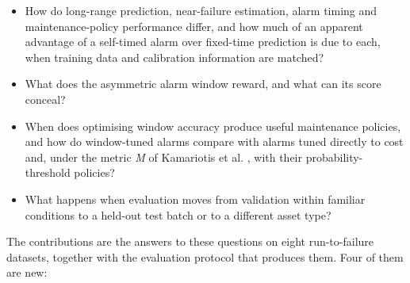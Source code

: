 \documentclass[a4paper,fleqn,doubleblind]{cas-dc}
\begin{document}
\begin{itemize}[leftmargin=1.2em,itemsep=2pt]
\item[(Q1)] How do long-range prediction, near-failure estimation, alarm timing and maintenance-policy performance differ, and how much of an apparent advantage of a self-timed alarm over fixed-time prediction is due to each, when training data and calibration information are matched?
\item[(Q2)] What does the asymmetric alarm window reward, and what can its score conceal?
\item[(Q3)] When does optimising window accuracy produce useful maintenance policies, and how do window-tuned alarms compare with alarms tuned directly to cost and, under the metric \textit{M} of Kamariotis et al. \cite{kamariotis2024}, with their probability-threshold policies?
\item[(Q4)] What happens when evaluation moves from validation within familiar conditions to a held-out test batch or to a different asset type?
\end{itemize}

The contributions are the answers to these questions on eight run-to-failure datasets, together with the evaluation protocol that produces them. Four of them are new:
\end{document}
